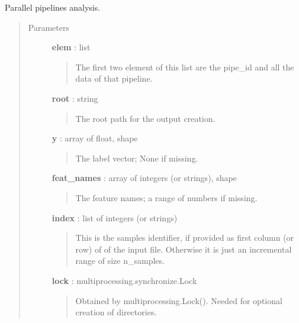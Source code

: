 \documentclass[letterpaper,10pt,english]{sphinxmanual}
\begin{document}
\begin{fulllineitems}
\label{index:adenine.core.analyze_results.analysis_worker}
Parallel pipelines analysis.
\begin{quote}\begin{description}
\item[{Parameters}] \leavevmode
\textbf{elem} : list
\begin{quote}

The first two element of this list are the pipe\_id and all the data of
that pipeline.
\end{quote}

\textbf{root} : string
\begin{quote}

The root path for the output creation.
\end{quote}

\textbf{y} : array of float, shape
\begin{quote}

The label vector; None if missing.
\end{quote}

\textbf{feat\_names} : array of integers (or strings), shape
\begin{quote}

The feature names; a range of numbers if missing.
\end{quote}

\textbf{index} : list of integers (or strings)
\begin{quote}

This is the samples identifier, if provided as first column (or row) of
of the input file. Otherwise it is just an incremental range of size
n\_samples.
\end{quote}

\textbf{lock} : multiprocessing.synchronize.Lock
\begin{quote}

Obtained by multiprocessing.Lock().
Needed for optional creation of directories.
\end{quote}

\end{description}\end{quote}

\end{fulllineitems}
\end{document}
